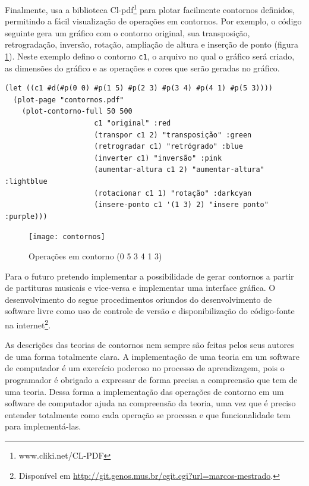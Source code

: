 Finalmente, \goiaba{} usa a biblioteca
Cl-pdf\footnote{www.cliki.net/CL-PDF} para plotar facilmente contornos
definidos, permitindo a fácil visualização de operações em contornos.
Por exemplo, o código seguinte gera um gráfico com o contorno
original, sua transposição, retrogradação, inversão, rotação,
ampliação de altura e inserção de ponto (figura
\ref{fig:operacoes}). Neste exemplo defino o contorno \verb!c1!, o
arquivo no qual o gráfico será criado, as dimensões do gráfico e as
operações e cores que serão geradas no gráfico.

\singlespacing
\begin{verbatim}
(let ((c1 #d(#p(0 0) #p(1 5) #p(2 3) #p(3 4) #p(4 1) #p(5 3))))
  (plot-page "contornos.pdf"
    (plot-contorno-full 50 500
                     c1 "original" :red
                     (transpor c1 2) "transposição" :green
                     (retrogradar c1) "retrógrado" :blue
                     (inverter c1) "inversão" :pink
                     (aumentar-altura c1 2) "aumentar-altura" :lightblue
                     (rotacionar c1 1) "rotação" :darkcyan
                     (insere-ponto c1 '(1 3) 2) "insere ponto" :purple)))
\end{verbatim}
\doublespacing

\begin{figure}
  \centering
  \texttt{[image: contornos]}
  \caption{Operações em contorno (0 5 3 4 1 3)}
  \label{fig:operacoes}
\end{figure}

Para o futuro pretendo implementar a possibilidade de gerar contornos
a partir de partituras musicais e vice-versa e implementar uma
interface gráfica. O desenvolvimento do \goiaba{} segue procedimentos
oriundos do desenvolvimento de software livre como uso de controle de
versão e disponibilização do código-fonte na
internet\footnote{Disponível em
  \url{http://git.genos.mus.br/cgit.cgi?url=marcos-mestrado}.}.

As descrições das teorias de contornos nem sempre são feitas pelos
seus autores de uma forma totalmente clara. A implementação de uma
teoria em um software de computador é um exercício poderoso no
processo de aprendizagem, pois o programador é obrigado a expressar de
forma precisa a compreensão que tem de uma teoria. Dessa forma a
implementação das operações de contorno em um software de computador
ajuda na compreensão da teoria, uma vez que é preciso entender
totalmente como cada operação se processa e que funcionalidade tem
para implementá-las.

